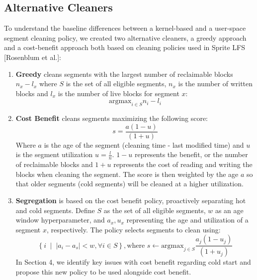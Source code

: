 \documentclass[12pt]{article}
\begin{document}
\subsection{Alternative Cleaners}
To understand the baseline differences between a kernel-based and a user-space segment cleaning policy, we created two alternative cleaners, a greedy approach and a cost-benefit approach both based on cleaning policies used in Sprite LFS [Rosenblum et al.]: 
\begin{enumerate}
    \item \textbf{Greedy} cleans segments with the largest number of reclaimable blocks $n_x-l_x$ where $S$ is the set of all eligible segments, $n_x$ is the number of written blocks and $l_x$ is the number of live blocks for segment $x$: 
    \[\text{argmax}_{i \in S}n_i-l_i\]
    \item \textbf{Cost Benefit} cleans segments maximizing the following score: 
    \[s=\frac{a(1-u)}{(1+u)}\]
    Where $a$ is the age of the segment (cleaning time - last modified time) and $u$ is the segment utilization $u=\frac{l}{n}$. $1-u$ represents the benefit, or the number of reclaimable blocks and $1+u$ represents the cost of reading and writing the blocks when cleaning the segment. The score is then weighted by the age $a$ so that older segments (cold segments) will be cleaned at a higher utilization. 
    \item \textbf{Segregation} is based on the cost benefit policy, proactively separating hot and cold segments. Define $S$ as the set of all eligible segments, $w$ as an age window hyperparameter, and $a_x, u_x$ representing the age and utilization of a segment $x$, respectively. The policy selects segments to clean using: 
    \[\left\{i \;\middle|\; |a_i-a_s| < w, \forall i \in S\right\}, \text{where }s \gets \text{argmax}_{j \in S}\frac{a_j(1-u_j)}{(1+u_j)} \]
    In Section 4, we identify key issues with cost benefit regarding cold start and propose this new policy to be used alongside cost benefit. 
\end{enumerate}
\end{document}
